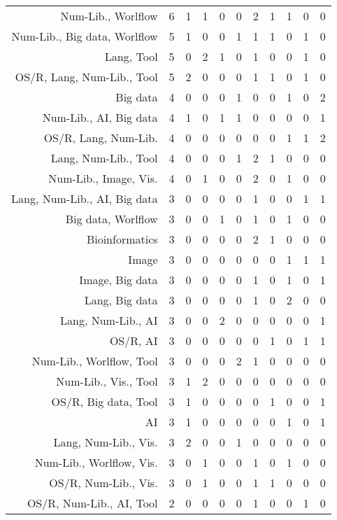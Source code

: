 {\begin{landscape}
\begin{longtable}[htb]{r|c|c|c|c|c|c|c|c|c|c}
{Num-Lib., Worlflow} & 6 & 1 & 1 & 0 & 0 & 2 & 1 & 1 & 0 & 0 \\%
{Num-Lib., Big data, Worlflow} & 5 & 1 & 0 & 0 & 1 & 1 & 1 & 0 & 1 & 0 \\%
{Lang, Tool} & 5 & 0 & 2 & 1 & 0 & 1 & 0 & 0 & 1 & 0 \\%
{OS/R, Lang, Num-Lib., Tool} & 5 & 2 & 0 & 0 & 0 & 1 & 1 & 0 & 1 & 0 \\%
{Big data} & 4 & 0 & 0 & 0 & 1 & 0 & 0 & 1 & 0 & 2 \\%
{Num-Lib., AI, Big data} & 4 & 1 & 0 & 1 & 1 & 0 & 0 & 0 & 0 & 1 \\%
{OS/R, Lang, Num-Lib.} & 4 & 0 & 0 & 0 & 0 & 0 & 0 & 1 & 1 & 2 \\%
{Lang, Num-Lib., Tool} & 4 & 0 & 0 & 0 & 1 & 2 & 1 & 0 & 0 & 0 \\%
{Num-Lib., Image, Vis.} & 4 & 0 & 1 & 0 & 0 & 2 & 0 & 1 & 0 & 0 \\%
{Lang, Num-Lib., AI, Big data} & 3 & 0 & 0 & 0 & 0 & 1 & 0 & 0 & 1 & 1 \\%
{Big data, Worlflow} & 3 & 0 & 0 & 1 & 0 & 1 & 0 & 1 & 0 & 0 \\%
{Bioinformatics} & 3 & 0 & 0 & 0 & 0 & 2 & 1 & 0 & 0 & 0 \\%
{Image} & 3 & 0 & 0 & 0 & 0 & 0 & 0 & 1 & 1 & 1 \\%
{Image, Big data} & 3 & 0 & 0 & 0 & 0 & 1 & 0 & 1 & 0 & 1 \\%
{Lang, Big data} & 3 & 0 & 0 & 0 & 0 & 1 & 0 & 2 & 0 & 0 \\%
{Lang, Num-Lib., AI} & 3 & 0 & 0 & 2 & 0 & 0 & 0 & 0 & 0 & 1 \\%
{OS/R, AI} & 3 & 0 & 0 & 0 & 0 & 0 & 1 & 0 & 1 & 1 \\%
{Num-Lib., Worlflow, Tool} & 3 & 0 & 0 & 0 & 2 & 1 & 0 & 0 & 0 & 0 \\%
{Num-Lib., Vis., Tool} & 3 & 1 & 2 & 0 & 0 & 0 & 0 & 0 & 0 & 0 \\%
{OS/R, Big data, Tool} & 3 & 1 & 0 & 0 & 0 & 0 & 1 & 0 & 0 & 1 \\%
{AI} & 3 & 1 & 0 & 0 & 0 & 0 & 0 & 1 & 0 & 1 \\%
{Lang, Num-Lib., Vis.} & 3 & 2 & 0 & 0 & 1 & 0 & 0 & 0 & 0 & 0 \\%
{Num-Lib., Worlflow, Vis.} & 3 & 0 & 1 & 0 & 0 & 1 & 0 & 1 & 0 & 0 \\%
{OS/R, Num-Lib., Vis.} & 3 & 0 & 1 & 0 & 0 & 1 & 1 & 0 & 0 & 0 \\%
{OS/R, Num-Lib., AI, Tool} & 2 & 0 & 0 & 0 & 0 & 1 & 0 & 0 & 1 & 0 \\%

\end{longtable}
\end{landscape}}

